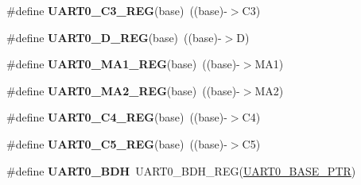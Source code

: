 \begin{DoxyCompactItemize}
\item 
\mbox{\label{group___u_a_r_t0___register___accessor___macros_ga35fad3cd1f0ba155d9633ee934e8558b}} 
\#define {\bfseries U\+A\+R\+T0\+\_\+\+C3\+\_\+\+R\+EG}(base)~((base)-\/$>$C3)
\item 
\mbox{\label{group___u_a_r_t0___register___accessor___macros_ga1ee897419a523f18221caa3abe1b3159}} 
\#define {\bfseries U\+A\+R\+T0\+\_\+\+D\+\_\+\+R\+EG}(base)~((base)-\/$>$D)
\item 
\mbox{\label{group___u_a_r_t0___register___accessor___macros_ga7eaf50c73e903f89f97370dd87c507a5}} 
\#define {\bfseries U\+A\+R\+T0\+\_\+\+M\+A1\+\_\+\+R\+EG}(base)~((base)-\/$>$M\+A1)
\item 
\mbox{\label{group___u_a_r_t0___register___accessor___macros_ga94d24feeb28228679ff183703948cd1c}} 
\#define {\bfseries U\+A\+R\+T0\+\_\+\+M\+A2\+\_\+\+R\+EG}(base)~((base)-\/$>$M\+A2)
\item 
\mbox{\label{group___u_a_r_t0___register___accessor___macros_ga3f4e82f4aa7ddbd86f04a6acff85b938}} 
\#define {\bfseries U\+A\+R\+T0\+\_\+\+C4\+\_\+\+R\+EG}(base)~((base)-\/$>$C4)
\item 
\mbox{\label{group___u_a_r_t0___register___accessor___macros_ga6ada2400c47eb55801b267941220c48a}} 
\#define {\bfseries U\+A\+R\+T0\+\_\+\+C5\+\_\+\+R\+EG}(base)~((base)-\/$>$C5)
\item 
\mbox{\label{group___u_a_r_t0___register___accessor___macros_ga0f086bea96574c5a4b90ff7ce1a99256}} 
\#define {\bfseries U\+A\+R\+T0\+\_\+\+B\+DH}~U\+A\+R\+T0\+\_\+\+B\+D\+H\+\_\+\+R\+EG(\hyperlink{group___u_a_r_t0___peripheral_ga50a02c91ffbd11fa7b4f0c33fe585199}{U\+A\+R\+T0\+\_\+\+B\+A\+S\+E\+\_\+\+P\+TR})
\item 
\mbox{\label{group___u_a_r_t0___register___accessor___macros_ga12ffbaeca152984beb3cbd1edaf94ee2}} 

\end{DoxyCompactItemize}
